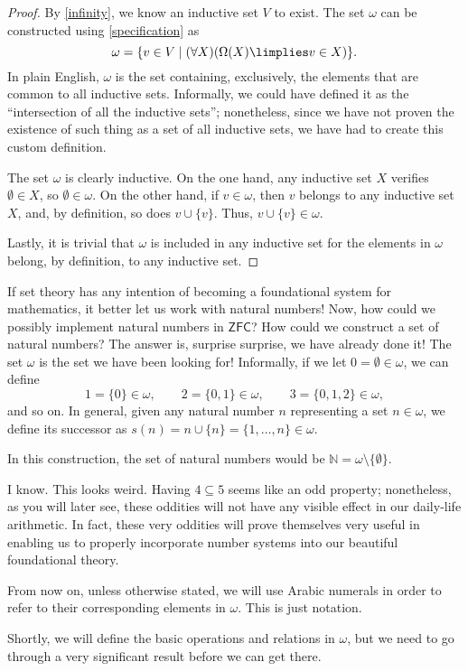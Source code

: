 \begin{proof}
By \ref{infinity}, we know an inductive set $V$ to exist. The set $\omega$ can be constructed using \ref{specification} as
\[ \omega = \{v\in V\mid (\forall X)(\Omega(X)\limplies v\in X)\}.\]
In plain English, $\omega$ is the set containing, exclusively, the elements that are common to all inductive sets.
Informally, we could have defined it as the ``intersection of all the inductive sets''; nonetheless, since we have not proven the existence of such thing as a set of all inductive sets, we have had to create this custom definition.

The set $\omega$ is clearly inductive. On the one hand, any inductive set $X$ verifies $\emptyset \in X$, so $\emptyset\in \omega$.
On the other hand, if $v\in\omega$, then $v$ belongs to any inductive set $X$, and, by definition, so does $v\cup\{v\}$. Thus, $v\cup\{v\}\in \omega$.

Lastly, it is trivial that $\omega$ is included in any inductive set for the elements in $\omega$ belong, by definition, to any inductive set.
\end{proof}


\begin{para}
If set theory has any intention of becoming a foundational system for mathematics, it better let us work with natural numbers!
Now, how could we possibly implement natural numbers in $\mathsf{ZFC}$? How could we construct a set of natural numbers?
The answer is, surprise surprise, we have already done it! The set $\omega$ is the set we have been looking for! Informally, if we let $0 = \emptyset\in \omega$, we can define
\[ 1 = \{0\}\in \omega,\qquad 2 = \{0,1\} \in \omega, \qquad 3 = \{0,1,2\}\in \omega,\]
and so on. In general, given any natural number $n$ representing a set $n\in \omega$, we define its successor as $s(n) = n \cup \{n\} = \{1,\ldots,n\}\in \omega$. 

In this construction, the set of natural numbers would be $\mathbb{N} = \omega \setminus \{\emptyset\}$.

I know. This looks weird. Having $4\subseteq 5$ seems like an odd property; nonetheless, as you will later see, these oddities will not have any visible effect in our daily-life arithmetic.
In fact, these very oddities will prove themselves very useful in enabling us to properly incorporate number systems into our beautiful foundational theory.

From now on, unless otherwise stated, we will use Arabic numerals in order to refer to their corresponding elements in $\omega$. This is just notation.

Shortly, we will define the basic operations and relations in $\omega$, but we need to go through a very significant result before we can get there.
\end{para}


